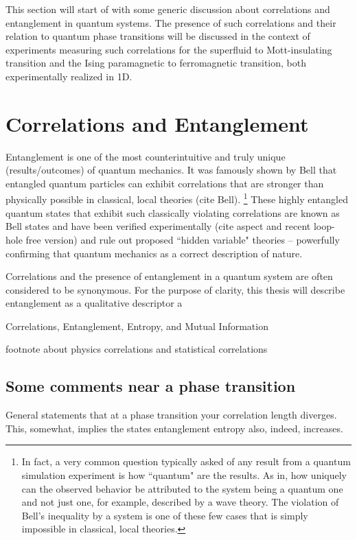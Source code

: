 This section will start of with some generic discussion about correlations and entanglement in quantum systems. The presence of such correlations and their relation to quantum phase transitions will be discussed in the context of experiments measuring such correlations for the superfluid to Mott-insulating transition and the Ising paramagnetic to ferromagnetic transition, both experimentally realized in 1D.

\section{Correlations and Entanglement}

Entanglement is one of the most counterintuitive and truly unique (results/outcomes) of quantum mechanics. It was famously shown by Bell that entangled quantum particles can exhibit correlations that are stronger than physically possible in classical, local theories (cite Bell). \footnote{In fact, a very common question typically asked of any result from a quantum simulation experiment is how ``quantum" are the results. As in, how uniquely can the observed behavior be attributed to the system being a quantum one and not just one, for example, described by a wave theory. The violation of Bell's inequality by a system is one of these few cases that is simply impossible in classical, local theories.} These highly entangled quantum states that exhibit such classically violating correlations are known as Bell states and have been verified experimentally (cite aspect and recent loop-hole free version) and rule out proposed ``hidden variable" theories -- powerfully confirming that quantum mechanics as a correct description of nature.



Correlations and the presence of entanglement in a quantum system are often considered to be synonymous. For the purpose of clarity, this thesis will describe entanglement as a qualitative descriptor a

Correlations, Entanglement, Entropy, and Mutual Information

footnote about physics correlations and statistical correlations

\subsection{Some comments near a phase transition}

General statements that at a phase transition your correlation length diverges. This, somewhat, implies the states entanglement entropy also, indeed, increases. 

